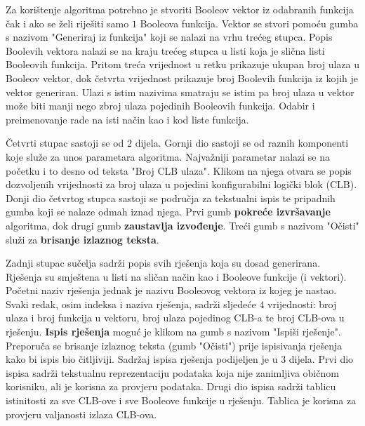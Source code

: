 \documentclass[times, utf8, diplomski]{fer}
\begin{document}
Za korištenje algoritma potrebno je stvoriti Booleov vektor iz odabranih funkcija čak i ako se želi riješiti samo $1$ Booleova funkcija. Vektor se stvori pomoću gumba s nazivom "Generiraj iz funkcija" koji se nalazi na vrhu trećeg stupca. Popis Boolevih vektora nalazi se na kraju trećeg stupca u listi koja je slična listi Booleovih funkcija. Pritom treća vrijednost u retku prikazuje ukupan broj ulaza u Booleov vektor, dok četvrta vrijednost prikazuje broj Boolevih funkcija iz kojih je vektor generiran. Ulazi s istim nazivima smatraju se istim pa broj ulaza u vektor može biti manji nego zbroj ulaza pojedinih Booleovih funkcija. Odabir i preimenovanje rade na isti način kao i kod liste funkcija.

Četvrti stupac sastoji se od $2$ dijela. Gornji dio sastoji se od raznih komponenti koje služe za unos parametara algoritma. Najvažniji parametar nalazi se na početku i to desno od teksta "Broj CLB ulaza". Klikom na njega otvara se popis dozvoljenih vrijednosti za broj ulaza u pojedini konfigurabilni logički blok (CLB). Donji dio četvrtog stupca sastoji se područja za tekstualni ispis te pripadnih gumba koji se nalaze odmah iznad njega. Prvi gumb \textbf{pokreće izvršavanje} algoritma, dok drugi gumb \textbf{zaustavlja izvođenje}. Treći gumb s nazivom "Očisti" služi za \textbf{brisanje izlaznog teksta}. 

Zadnji stupac sučelja sadrži popis svih rješenja koja su dosad generirana. Rješenja su smještena u listi na sličan način kao i Booleove funkcije (i vektori). Početni naziv rješenja jednak je nazivu Booleovog vektora iz kojeg je nastao. Svaki redak, osim indeksa i naziva rješenja, sadrži sljedeće $4$ vrijednosti: broj ulaza i broj funkcija u vektoru, broj ulaza pojedinog CLB-a te broj CLB-ova u rješenju. \textbf{Ispis rješenja} moguć je klikom na gumb s nazivom "Ispiši rješenje". Preporuča se brisanje izlaznog teksta (gumb "Očisti") prije ispisivanja rješenja kako bi ispis bio čitljiviji. Sadržaj ispisa rješenja podijeljen je u $3$ dijela. Prvi dio ispisa sadrži tekstualnu reprezentaciju podataka koja nije zanimljiva običnom korisniku, ali je korisna za provjeru podataka. Drugi dio ispisa sadrži tablicu istinitosti za sve CLB-ove i sve Booleove funkcije u rješenju. Tablica je korisna za provjeru valjanosti izlaza CLB-ova.
\end{document}
